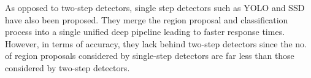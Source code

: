 As opposed to two-step detectors, single step detectors such as YOLO\cite{redmon2016you,redmon2018yolov3} and SSD\cite{liu2016ssd} have also been proposed. They merge the region proposal and classification process into a single unified deep pipeline leading to faster response times. However, in terms of accuracy, they lack behind two-step detectors since the no. of region proposals considered by single-step detectors are far less than those considered by two-step detectors. 










